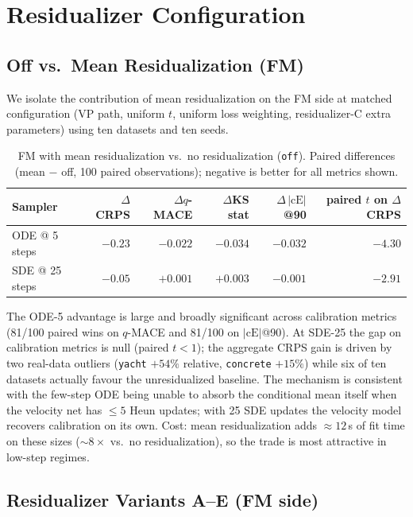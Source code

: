 \documentclass{uai2026}
\begin{document}
\section{Residualizer Configuration}\label{app:resid-config}

\subsection{Off vs.\ Mean Residualization (FM)}\label{app:off-vs-mean}

We isolate the contribution of mean residualization on the FM side at matched configuration (VP path, uniform $t$, uniform loss weighting, residualizer-C extra parameters) using ten datasets and ten seeds.

\begin{table}[!h]
  \centering
  \caption{FM with mean residualization vs.\ no residualization (\texttt{off}). Paired differences (mean $-$ off, 100 paired observations); negative is better for all metrics shown.}\label{tab:off-vs-mean}
  \footnotesize
  \begin{tabular}{lrrrrr}
    \toprule
    Sampler & $\Delta$CRPS & $\Delta q$-MACE & $\Delta$KS stat & $\Delta\,|\text{cE}|$@90 & paired $t$ on $\Delta$CRPS \\
    \midrule
    ODE @ 5 steps  & $-0.23$ & $-0.022$ & $-0.034$ & $-0.032$ & $-4.30$ \\
    SDE @ 25 steps & $-0.05$ & $+0.001$ & $+0.003$ & $-0.001$ & $-2.91$ \\
    \bottomrule
  \end{tabular}
\end{table}

The ODE-5 advantage is large and broadly significant across calibration metrics (81/100 paired wins on $q$-MACE and 81/100 on $|\text{cE}|$@90). At SDE-25 the gap on calibration metrics is null (paired $t<1$); the aggregate CRPS gain is driven by two real-data outliers (\texttt{yacht} $+54\%$ relative, \texttt{concrete} $+15\%$) while six of ten datasets actually favour the unresidualized baseline. The mechanism is consistent with the few-step ODE being unable to absorb the conditional mean itself when the velocity net has $\leq 5$ Heun updates; with 25 SDE updates the velocity model recovers calibration on its own. Cost: mean residualization adds $\approx 12$\,s of fit time on these sizes ($\sim 8\times$ vs.\ no residualization), so the trade is most attractive in low-step regimes.

\subsection{Residualizer Variants A--E (FM side)}\label{app:resid-AE}
\end{document}
